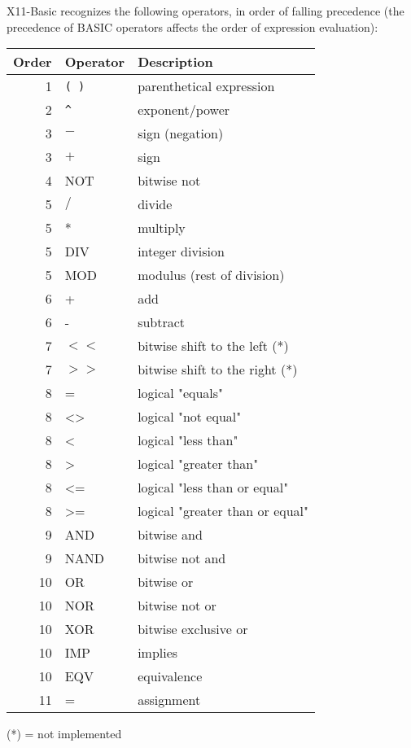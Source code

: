 X11-Basic recognizes the following operators, in order of falling precedence 
(the precedence of BASIC operators affects the order of expression evaluation):
\begin{center}
\begin{longtable}{|r|l|l|}
\hline
{\bf Order}&{\bf Operator}  &  {\bf Description} \\
\hline
1&\verb|( )|&  parenthetical expression\\
2&\verb|^|&    exponent/power	       \\
3&$-$	  &    sign (negation)         \\
3&$+$	  &    sign		       \\
4&NOT	  &    bitwise not	       \\
5&$/$	  &    divide 	               \\
5&*	  &    multiply 	       \\
5&DIV     &    integer division        \\
5&MOD	  &    modulus (rest of division)     \\
6&+	  &    add			      \\
6&-	  &    subtract 		      \\
7&$<<$	  &    bitwise shift to the left  (*) \\
7&$>>$	  &    bitwise shift to the right (*) \\
8&=	  &    logical "equals" 	      \\
8&<>	  &    logical "not equal"	      \\
8&<	  &    logical "less than"	      \\
8&>	  &    logical "greater than"	      \\
8&<=	  &    logical "less than or equal"   \\
8&>=	  &    logical "greater than or equal"\\
9&AND	  &    bitwise and		      \\
9&NAND	  &    bitwise not and		      \\
10&OR	  &    bitwise or		      \\
10&NOR	  &    bitwise not or		      \\
10&XOR	  &    bitwise exclusive or	      \\
10&IMP	  &    implies  		      \\
10&EQV	  &    equivalence		      \\
11& =	  &    assignment \\ 
\hline
\end{longtable}
\end{center}
(*) = not implemented


